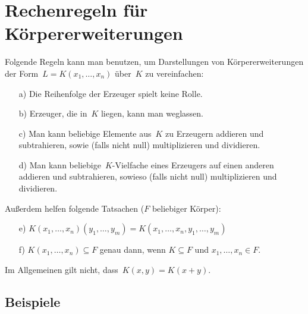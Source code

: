 \documentclass[12pt,a4paper,ngerman]{scrartcl}
\theoremstyle{definition}
\theoremstyle{plain}
\theoremstyle{remark}
\begin{document}
\section*{Rechenregeln für Körpererweiterungen}

Folgende Regeln kann man benutzen, um Darstellungen von Körpererweiterungen der
Form~$L = K(x_1,\ldots,x_n)$ über~$K$ zu vereinfachen:
\begin{enumerate}
\item[a)] Die Reihenfolge der Erzeuger spielt keine Rolle.
\item[b)] Erzeuger, die in~$K$ liegen, kann man weglassen.
\item[c)] Man kann beliebige Elemente aus~$K$ zu Erzeugern addieren und
subtrahieren, sowie (falls nicht null) multiplizieren und dividieren.
\item[d)] Man kann beliebige~$K$-Vielfache eines Erzeugers auf einen anderen
addieren und subtrahieren, sowieso (falls nicht null) multiplizieren und
dividieren.
\end{enumerate}

Außerdem helfen folgende Tatsachen ($F$ beliebiger Körper):
\begin{enumerate}
\item[e)] $K(x_1,\ldots,x_n)(y_1,\ldots,y_m) = K(x_1,\ldots,x_n,y_1,\ldots,y_m)$
\item[f)] $K(x_1,\ldots,x_n) \subseteq F$ genau dann, wenn $K \subseteq F$ und
$x_1,\ldots,x_n \in F$.
\end{enumerate}
Im Allgemeinen gilt nicht, dass~$K(x,y) = K(x+y)$.

\subsection*{Beispiele}
\end{document}
